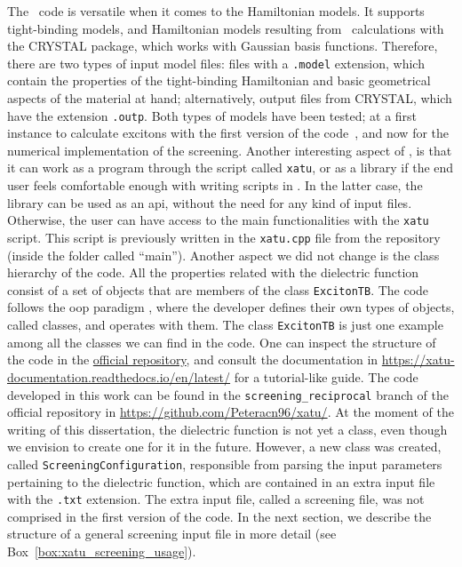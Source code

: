 The \xatu~code is versatile when it comes to the Hamiltonian models.
It supports tight-binding models, and Hamiltonian models resulting from \dft~calculations with the \textsc{CRYSTAL} package, which works with Gaussian basis functions.
Therefore, there are two types of input model files: files with a \texttt{.model} extension, which contain the properties of the tight-binding Hamiltonian and basic geometrical aspects of the material at hand; alternatively, output files from \textsc{CRYSTAL}, which have the extension \texttt{.outp}.
Both types of models have been tested; at a first instance to calculate excitons with the first version of the code~\cite{Xatu}, and now for the numerical implementation of the screening.
Another interesting aspect of \xatu, is that it can work as a program through the script called \texttt{xatu}, or as a library if the end user feels comfortable enough with writing scripts in \CC\@.
In the latter case, the library can be used as an \gls{api}, without the need for any kind of input files.
Otherwise, the user can have access to the main functionalities with the \texttt{xatu} script.
This script is previously written in the \texttt{xatu.cpp} file from the repository (inside the folder called ``main'').
Another aspect we did not change is the class hierarchy of the code.
All the properties related with the dielectric function consist of a set of objects that are members of the class \texttt{ExcitonTB}.
The code  follows the \gls{oop} paradigm , where the developer defines their own types of objects, called classes, and operates with them.
The class \texttt{ExcitonTB} is just one example among all the classes we can find in the code.
One can inspect the structure of the code in the \href{https://github.com/xatu-code/xatu}{official repository}, and consult the documentation in \url{https://xatu-documentation.readthedocs.io/en/latest/} for a tutorial-like guide.
The code  developed in this work can be found in the \texttt{screening\_reciprocal} branch of the official repository in \url{https://github.com/Peteracn96/xatu/}.
At the moment of the writing of this dissertation, the dielectric function is not yet a class, even though we envision to create one for it in the future.
However, a new class was created, called \texttt{ScreeningConfiguration}, responsible from parsing the input parameters pertaining to the dielectric function, which are contained in an extra input file with the \texttt{.txt} extension.
The extra input file, called a screening file, was not comprised in the first version of the code.
In the next section, we describe the structure of a general screening input file in more detail (see Box~\ref{box:xatu_screening_usage}).

